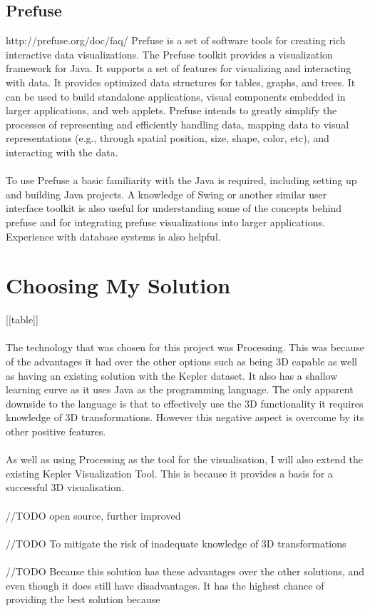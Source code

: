 \documentclass[11pt
              , a4paper
              , twoside
              , openright
              ]{report}
\begin{document}
\subsection{Prefuse}
http://prefuse.org/doc/faq/
Prefuse is a set of software tools for creating rich interactive data visualizations. The Prefuse toolkit provides a visualization framework for Java.  It supports a set of features for visualizing and interacting with data. It provides optimized data structures for tables, graphs, and trees. It can be used to build standalone applications, visual components embedded in larger applications, and web applets. Prefuse intends to greatly simplify the processes of representing and efficiently handling data, mapping data to visual representations (e.g., through spatial position, size, shape, color, etc), and interacting with the data. 
\\\\
To use Prefuse a basic familiarity with the Java is required, including setting up and building Java projects. A knowledge of Swing or another similar user interface toolkit is also useful for understanding some of the concepts behind prefuse and for integrating prefuse visualizations into larger applications. Experience with database systems is also helpful.
\section{Choosing My Solution}
[[table]]
\\\\
The technology that was chosen for this project was Processing. This was because of the advantages it had over the other options such as being 3D capable as well as having an existing solution with the Kepler dataset. It also has a shallow learning curve as it uses Java as the programming language. The only apparent downside to the language is that to effectively use the 3D functionality it requires knowledge of 3D transformations. However this negative aspect is overcome by its other positive features.
\\\\
As well as using Processing as the tool for the visualisation, I will also extend the existing Kepler Visualization Tool. This is because it provides a basis for a successful 3D visualisation.
\\\\
//TODO open source, further improved
\\\\
//TODO To mitigate the risk of inadequate knowledge of 3D transformations
\\\\
//TODO Because this solution has these advantages over the other solutions, and even though it does still have disadvantages. It has the highest chance of providing the best solution because 
\end{document}
